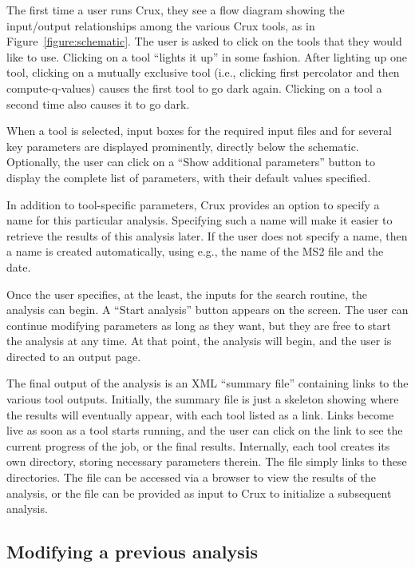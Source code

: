 \documentclass{article}
\begin{document}
The first time a user runs Crux, they see a flow diagram showing the
input/output relationships among the various Crux tools, as in
Figure~\ref{figure:schematic}.  The user is asked to click on the
tools that they would like to use.  Clicking on a tool ``lights it
up'' in some fashion.  After lighting up one tool, clicking on a
mutually exclusive tool (i.e., clicking first percolator and then
compute-q-values) causes the first tool to go dark again.  Clicking on
a tool a second time also causes it to go dark.

When a tool is selected, input boxes for the required input files and
for several key parameters are displayed prominently, directly below
the schematic.  Optionally, the user can click on a ``Show additional
parameters'' button to display the complete list of parameters, with
their default values specified.

In addition to tool-specific parameters, Crux provides an option to
specify a name for this particular analysis.  Specifying such a name
will make it easier to retrieve the results of this analysis later.
If the user does not specify a name, then a name is created
automatically, using e.g., the name of the MS2 file and the date.

Once the user specifies, at the least, the inputs for the search
routine, the analysis can begin.  A ``Start analysis'' button appears
on the screen.  The user can continue modifying parameters as long as
they want, but they are free to start the analysis at any time.  At
that point, the analysis will begin, and the user is directed to an
output page.

The final output of the analysis is an XML ``summary file'' containing
links to the various tool outputs.  Initially, the summary file is
just a skeleton showing where the results will eventually appear, with
each tool listed as a link.  Links become live as soon as a tool
starts running, and the user can click on the link to see the current
progress of the job, or the final results.  Internally, each tool
creates its own directory, storing necessary parameters therein.  The
file simply links to these directories.  The file can be accessed via
a browser to view the results of the analysis, or the file can be
provided as input to Crux to initialize a subsequent analysis.

\subsection{Modifying a previous analysis}
\end{document}
